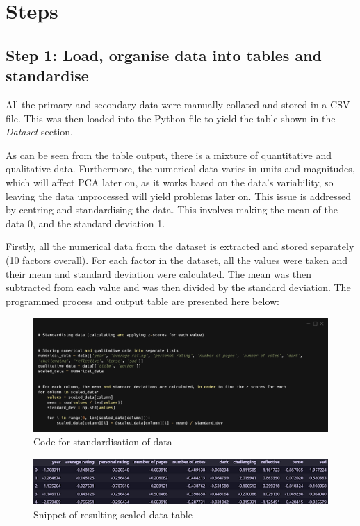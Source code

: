 \documentclass[12pt]{article}
\begin{document}
\section{Steps}
\subsection{Step 1: Load, organise data into tables and standardise}
All the primary and secondary data were manually collated and stored in a CSV file. This was then loaded into the Python file to yield the table shown in the \textit{Dataset} section.

As can be seen from the table output, there is a mixture of quantitative and qualitative data. Furthermore, the numerical data varies in units and magnitudes, which will affect PCA later on, as it works based on the data’s variability, so leaving the data unprocessed will yield problems later on. This issue is addressed by centring and standardising the data. This involves making the mean of the data 0, and the standard deviation 1.

Firstly, all the numerical data from the dataset is extracted and stored separately (10 factors overall). For each factor in the dataset, all the values were taken and their mean and standard deviation were calculated. The mean was then subtracted from each value and was then divided by the standard deviation. The programmed process and output table are presented here below:

\begin{figure}[H]
	\includegraphics[width=\textwidth]{code1}
	\centering
	\caption{Code for standardisation of data}
\end{figure}

\begin{figure}[H]
	\includegraphics[width=\textwidth]{2}
	\centering
	\caption{Snippet of resulting scaled data table}
\end{figure}
\end{document}
